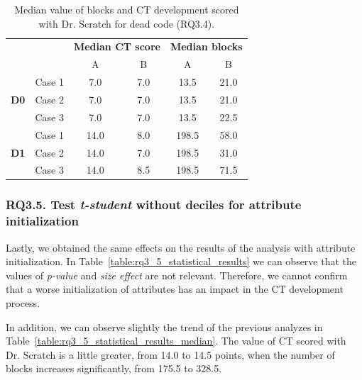 \begin{table}
 \begin{center}
  \begin{tabular}{|c|c|c|c|c|c|}
    \cline{3-6}
     \multicolumn{2}{c}{} & 
     \multicolumn{2}{|c|}{\textbf{Median CT score}} & \multicolumn{2}{|c|}{\textbf{Median blocks}} \\ 
     \cline{3-6}
     \multicolumn{2}{c|}{} & A & B & A & B \\ \hline
     \multirow{3}{*}{\textbf{D0}}
     & Case 1 & 7.0 & 7.0 & 13.5 & 21.0 \\
     & Case 2 & 7.0 & 7.0 & 13.5 & 21.0 \\
     & Case 3 & 7.0 & 7.0 & 13.5 & 22.5 \\ \hline
     \multirow{3}{*}{\textbf{D1}}
     & Case 1 & 14.0 & 8.0 & 198.5 & 58.0 \\
     & Case 2 & 14.0 & 7.0 & 198.5 & 31.0 \\
     & Case 3 & 14.0 & 8.5 & 198.5 & 71.5 \\ \hline
  \end{tabular}
  \caption{Median value of blocks and CT development scored with Dr. Scratch for dead code (RQ3.4).}
  \label{table:rq3_4_statistical_results_median}
 \end{center}
\end{table}



\subsubsection{RQ3.5. Test \textit{t-student} without deciles for attribute initialization}
\label{subsubsec:RQ3_5_statistical_results}

Lastly, we obtained the same effects on the results of the analysis with attribute initialization. In Table~\ref{table:rq3_5_statistical_results} we can observe that the values of \textit{p-value} and \textit{size effect} are not relevant. Therefore, we cannot confirm that a worse initialization of attributes has an impact in the CT development process. 

In addition, we can observe slightly the trend of the previous analyzes in Table~\ref{table:rq3_5_statistical_results_median}. The value of CT scored with Dr. Scratch is a little greater, from 14.0 to 14.5 points, when the number of blocks increases significantly, from 175.5 to 328.5.

